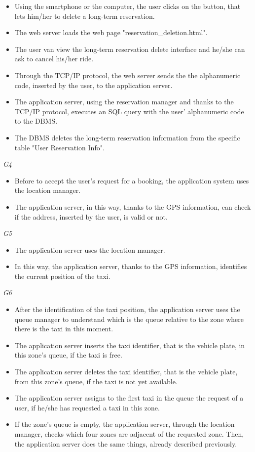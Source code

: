 		\begin{itemize}
			\item Using the smartphone or the computer, the user clicks on the button, that lets him/her to delete a long-term reservation.
			\item The web server loads the web page "reservation_deletion.html".
			\item The user van view the long-term reservation delete interface and he/she can ask to cancel his/her ride.
			\item Through the TCP/IP protocol, the web server sends the the alphanumeric code, inserted by the user, to the application server.
			\item The application server, using the reservation manager and thanks to the TCP/IP protocol, executes an SQL query with the user' alphanumeric code to the DBMS.
			\item The DBMS deletes the long-term reservation information from the specific table "User Reservation Info".
		\end{itemize}
	\emph{G4}
		\begin{itemize}
			\item Before to accept the user's request for a booking, the application system uses the location manager.
			\item The application server, in this way, thanks to the GPS information, can check if the address, inserted by the user, is valid or not.
		\end{itemize}
	\emph{G5}
		\begin{itemize}
			\item The application server uses the location manager.
			\item In this way, the application server, thanks to the GPS information, identifies the current position of the taxi.
		\end{itemize}
	\emph{G6}
		\begin{itemize}
			\item After the identification of the taxi position, the application server uses the queue manager to understand which is the queue relative to the zone where there is the taxi in this moment.
			\item The application server inserts the taxi identifier, that is the vehicle plate, in this zone's queue, if the taxi is free.
			\item The application server deletes the taxi identifier, that is the vehicle plate, from this zone's queue, if the taxi is not yet available.
			\item The application server assigns to the first taxi in the queue the request of a user, if he/she has requested a taxi in this zone.
			\item If the zone's queue is empty, the application server, through the location manager, checks which four zones are adjacent of the requested zone. Then, the application server does the same things, already described previously.
		\end{itemize}
